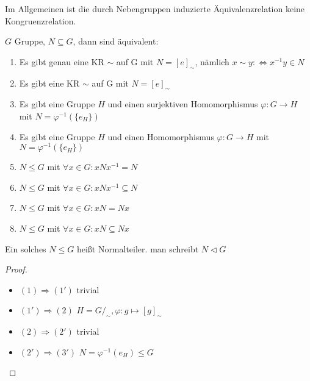 Im Allgemeinen ist die durch Nebengruppen induzierte Äquivalenzrelation keine Kongruenzrelation.

\begin{theorem}
    $G$ Gruppe, $N \subseteq G$, dann sind äquivalent:
    \begin{enumerate}[label=(\alph*)]
        \item Es gibt genau eine KR $\sim$ auf G mit $N = [e]_\sim$, nämlich $x \sim y: \Leftrightarrow x^{-1}y \in N$
        \item Es gibt eine KR $\sim$ auf G mit $N = [e]_\sim$
        \item Es gibt eine Gruppe $H$ und einen surjektiven Homomorphismus $\varphi: G \to H$ mit $N = \varphi^{-1}(\{e_H\})$
        \item Es gibt eine Gruppe $H$ und einen Homomorphismus $\varphi: G \to H$ mit $N = \varphi^{-1}(\{e_H\})$
        \item $N \le G$ mit $\forall x \in G: xNx^{-1} = N$
        \item $N \le G$ mit $\forall x \in G: xNx^{-1} \subseteq N$
        \item $N \le G$ mit $\forall x \in G: xN = Nx$
        \item $N \le G$ mit $\forall x \in G: xN \subseteq Nx$
    \end{enumerate}
\end{theorem}

\begin{definition}
    Ein solches $N \le G$ heißt Normalteiler. man schreibt $N\vartriangleleft G$
\end{definition}

\begin{proof}\phantom{.}
    \begin{itemize}[label={--}, topsep=0cm]
        \item $(1) \Rightarrow (1')$ trivial
        \item $(1') \Rightarrow (2)$ $H = G/_{\sim}, \varphi: g \mapsto [g]_\sim $
        \item $(2) \Rightarrow (2')$ trivial
        \item $(2') \Rightarrow (3')$ $N = \varphi^{-1}(e_H) \le G$
    \end{itemize}
\end{proof}
